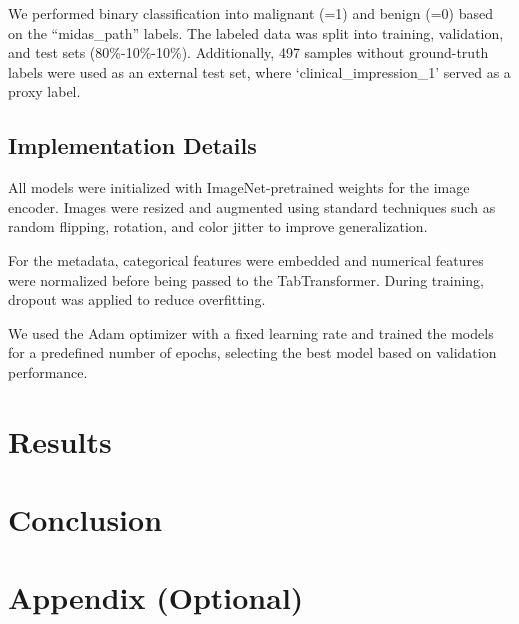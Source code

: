\documentclass{article}
\begin{document}
We performed binary classification into malignant (=1) and benign (=0) based on the “midas\_path” labels. The labeled data was split into training, validation, and test sets (80\%-10\%-10\%). Additionally, 497 samples without ground-truth labels were used as an external test set, where ‘clinical\_impression\_1’ served as a proxy label.


\subsection{Implementation Details}

All models were initialized with ImageNet-pretrained weights for the image encoder. Images were resized and augmented using standard techniques such as random flipping, rotation, and color jitter to improve generalization.

For the metadata, categorical features were embedded and numerical features were normalized before being passed to the TabTransformer. During training, dropout was applied to reduce overfitting.

We used the Adam optimizer with a fixed learning rate and trained the models for a predefined number of epochs, selecting the best model based on validation performance.


\section{Results}




\section{Conclusion}

\newpage
{\small


}

\appendix

\newpage
\section{Appendix (Optional)}
\end{document}
